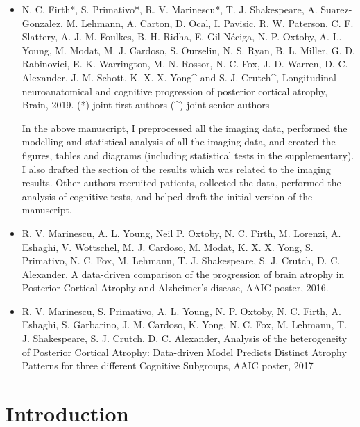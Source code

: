 \begin{itemize}
 \item N. C. Firth*, S. Primativo*, R. V. Marinescu*, T. J. Shakespeare, A. Suarez-Gonzalez, M. Lehmann, A. Carton, D. Ocal, I. Pavisic, R. W. Paterson, C. F. Slattery, A. J. M. Foulkes, B. H. Ridha, E. Gil-Néciga, N. P. Oxtoby, A. L. Young, M. Modat, M. J. Cardoso, S. Ourselin, N. S. Ryan, B. L. Miller, G. D. Rabinovici, E. K. Warrington, M. N. Rossor, N. C. Fox, J. D. Warren, D. C. Alexander, J. M. Schott, K. X. X. Yong\^{} and S. J. Crutch\^{}, Longitudinal neuroanatomical and cognitive progression of posterior cortical atrophy, Brain, 2019. (*) joint first authors (\^{}) joint senior authors
 
 In the above manuscript, I preprocessed all the imaging data, performed the modelling and statistical analysis of all the imaging data, and created the figures, tables and diagrams (including statistical tests in the supplementary). I also drafted the section of the results which was related to the imaging results. Other authors recruited patients, collected the data, performed the analysis of cognitive tests, and helped draft the initial version of the manuscript. 

 \item R. V. Marinescu, A. L. Young, Neil P. Oxtoby, N. C. Firth, M. Lorenzi, A. Eshaghi, V. Wottschel, M. J. Cardoso, M. Modat, K. X. X. Yong, S. Primativo, N. C. Fox, M. Lehmann, T. J. Shakespeare, S. J. Crutch, D. C. Alexander, A data-driven comparison of the progression of brain atrophy in Posterior Cortical Atrophy and Alzheimer's disease, AAIC poster, 2016.

 \item R. V. Marinescu, S. Primativo, A. L. Young, N. P. Oxtoby, N. C. Firth, A. Eshaghi, S. Garbarino, J. M. Cardoso, K. Yong, N. C. Fox, M. Lehmann, T. J. Shakespeare, S. J. Crutch, D. C. Alexander, Analysis of the heterogeneity of Posterior Cortical Atrophy: Data-driven Model Predicts Distinct Atrophy Patterns for three different Cognitive Subgroups, AAIC poster, 2017 
\end{itemize}


\section{Introduction}

